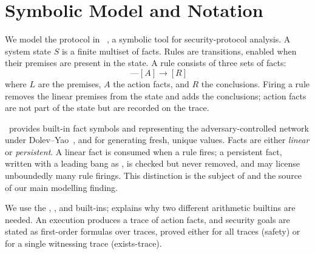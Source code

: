 \section{Symbolic Model and Notation}
\label{sec:notation}

We model the protocol in \mtamarin~\cite{meier2013tamarin}, a symbolic tool for
security-protocol analysis. A system state $S$ is a finite multiset of facts.
Rules are transitions, enabled when their premises are present in the state. A
rule consists of three sets of facts:
\begin{equation}
    [L] \; \text{--}\!\!\text{--}[A] \rightarrow [R]
\end{equation}
where $L$ are the premises, $A$ the action facts, and $R$ the conclusions.
Firing a rule removes the linear premises from the state and adds the
conclusions; action facts are not part of the state but are recorded on the
trace.

\mtamarin\ provides built-in fact symbols  and 
representing the adversary-controlled network under
Dolev--Yao~\cite{dolev1983security}, and  for generating fresh,
unique values. Facts are either \emph{linear} or \emph{persistent}. A linear
fact is consumed when a rule fires; a persistent fact, written with a leading
bang as , is checked but never removed, and may license unboundedly
many rule firings. This distinction is the subject of
 and the source of our main modelling finding.

We use the , ,  and
 built-ins;  explains why two different
arithmetic builtins are needed. An execution produces a trace of action facts,
and security goals are stated as first-order formulas over traces, proved
either for all traces (safety) or for a single witnessing trace
(exists-trace).
